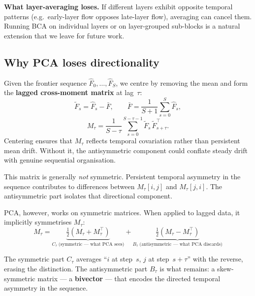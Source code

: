 \documentclass[11pt, twoside, openright]{memoir}
\numberwithin{equation}{chapter}
\begin{document}
\begin{pitfall}
\textbf{What layer-averaging loses.}
If different layers exhibit opposite temporal patterns (e.g.\
early-layer flow opposes late-layer flow), averaging can cancel them.
Running BCA on individual layers or on layer-grouped sub-blocks is a
natural extension that we leave for future work.
\end{pitfall}

\subsection*{Why PCA loses directionality}

Given the frontier sequence $\hat{F}_0, \ldots, \hat{F}_S$, we
centre by removing the mean and form the \textbf{lagged
cross-moment matrix} at lag~$\tau$:
\begin{equation}\label{eq:bca-centering}
  \tilde{F}_s = \hat{F}_s - \bar{F}, \qquad
  \bar{F} = \frac{1}{S+1}\sum_{s=0}^{S}\hat{F}_s,
\end{equation}
\begin{equation}\label{eq:lagged-moment}
  M_\tau = \frac{1}{S - \tau}\sum_{s=0}^{S-\tau-1}
    \tilde{F}_s \, \tilde{F}_{s+\tau}^\top.
\end{equation}
Centering ensures that $M_\tau$ reflects temporal covariation rather
than persistent mean drift.  Without it, the antisymmetric component
could conflate steady drift with genuine sequential organisation.

This matrix is generally \emph{not} symmetric.  Persistent temporal
asymmetry in the sequence contributes to differences between
$M_\tau[i,j]$ and $M_\tau[j,i]$.  The antisymmetric part isolates
that directional component.

PCA, however, works on symmetric matrices.  When applied to lagged
data, it implicitly symmetrises $M_\tau$:
\begin{equation}\label{eq:bca-decomp}
  M_\tau = \underbrace{\tfrac{1}{2}(M_\tau + M_\tau^\top)}_{C_\tau
    \;\text{(symmetric --- what PCA sees)}}
  + \underbrace{\tfrac{1}{2}(M_\tau - M_\tau^\top)}_{B_\tau
    \;\text{(antisymmetric --- what PCA discards)}}
\end{equation}

The symmetric part $C_\tau$ averages ``$i$ at step~$s$, $j$ at
step~$s{+}\tau$'' with the reverse, erasing the distinction.  The
antisymmetric part $B_\tau$ is what remains: a skew-symmetric
matrix --- a \textbf{bivector} --- that encodes the directed
temporal asymmetry in the sequence.
\end{document}
